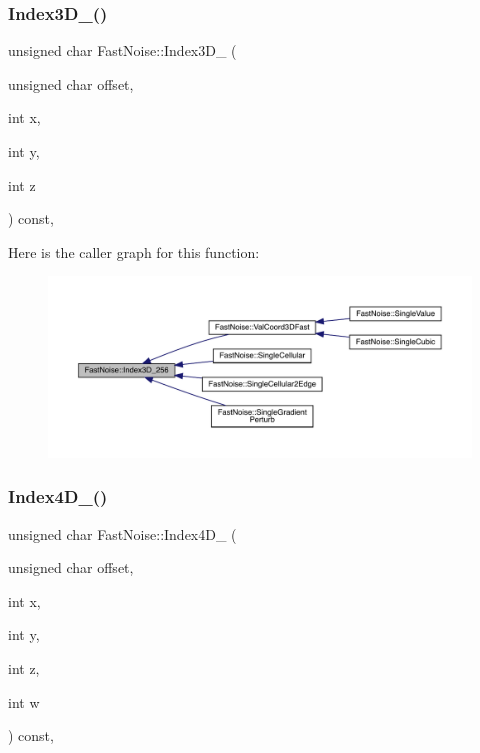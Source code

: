 \subsubsection{\texorpdfstring{Index3\+D\+\_()}{Index3D\_256()}}
{\footnotesize\ttfamily unsigned char Fast\+Noise\+::\+Index3\+D\+\_ (\begin{DoxyParamCaption}\item[{unsigned char}]{offset,  }\item[{int}]{x,  }\item[{int}]{y,  }\item[{int}]{z }\end{DoxyParamCaption}) const\hspace{0.3cm}{\ttfamily [inline]}, {\ttfamily [private]}}

Here is the caller graph for this function\+:
\nopagebreak
\begin{figure}[H]
\begin{center}
\leavevmode
\includegraphics[width=350pt]{d1/dd8/class_fast_noise_a1102de0e643266c5ea9b54a5bbca2476_icgraph}
\end{center}
\end{figure}
\mbox{\label{class_fast_noise_a911f18604455d0a36d9203edc0f3387b}} 
\subsubsection{\texorpdfstring{Index4\+D\+\_()}{Index4D\_256()}}
{\footnotesize\ttfamily unsigned char Fast\+Noise\+::\+Index4\+D\+\_ (\begin{DoxyParamCaption}\item[{unsigned char}]{offset,  }\item[{int}]{x,  }\item[{int}]{y,  }\item[{int}]{z,  }\item[{int}]{w }\end{DoxyParamCaption}) const\hspace{0.3cm}{\ttfamily [inline]}, {\ttfamily [private]}}

